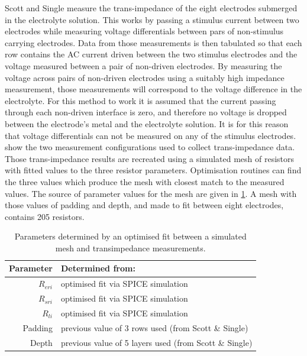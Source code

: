     Scott and Single measure the trans-impedance of the eight electrodes submerged in the electrolyte solution.
    This works by passing a stimulus current between two electrodes while measuring voltage differentials between pars of non-stimulus carrying electrodes.
    Data from those measurements is then tabulated so that each row contains the AC current driven between the two stimulus electrodes and the voltage measured between a pair of non-driven electrodes.
    By measuring the voltage across pairs of non-driven electrodes using a suitably high impedance measurement, those measurements will correspond to the voltage difference in the electrolyte.
    For this method to work it is assumed that the current passing through each non-driven interface is zero, and therefore no voltage is dropped between the electrode's metal and the electrolyte solution.
    It is for this reason that voltage differentials can not be measured on any of the stimulus electrodes.
     show the two measurement configurations used to collect trans-impedance data.
    Those trans-impedance results are recreated using a simulated mesh of resistors with fitted values to the three resistor parameters.
    Optimisation routines can find the three values which produce the mesh with closest match to the measured values.
    The source of parameter values for the mesh are given in \cref{tab:pt2-parameterDesc-ResistorMesh}.
    A mesh with those values of padding and depth, and made to fit between eight electrodes, contains 205 resistors.


    \begin{table}
      \begin{center}
        \begin{tabular} {r | l}
          Parameter & Determined from:\\
          \hline
          $R_{eri}$ & optimised fit via SPICE simulation\\
          $R_{sri}$ & optimised fit via SPICE simulation\\
          $R_{li}$ & optimised fit via SPICE simulation\\
          Padding & previous value of 3 rows used (from Scott \& Single)\\
          Depth & previous value of 5 layers used (from Scott \& Single)
        \end{tabular}
      \end{center}
      \caption{\label{tab:pt2-parameterDesc-ResistorMesh}Parameters determined by an optimised fit between a simulated mesh and transimpedance measurements.}
    \end{table}

